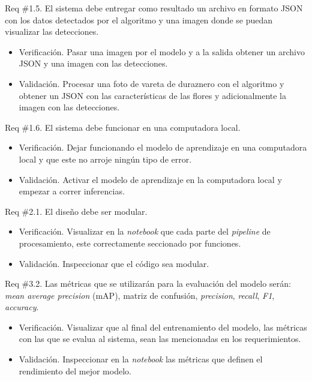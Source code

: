\documentclass[
11pt, %
]{charter}
\begin{document}
Req \#1.5. El sistema debe entregar como resultado un archivo en formato JSON con los datos detectados por el algoritmo y una imagen donde se puedan visualizar las detecciones.

\begin{itemize}
	\item Verificación. Pasar una imagen por el modelo y a la salida obtener un archivo JSON y una imagen con las detecciones.
	
	\item Validación. Procesar una foto de vareta de duraznero con el algoritmo y obtener un JSON con las características de las flores y adicionalmente la imagen con las detecciones. 
\end{itemize}

Req \#1.6. El sistema debe funcionar en una computadora local.

\begin{itemize}
	\item Verificación. Dejar funcionando el modelo de aprendizaje en una computadora local y que este no arroje ningún tipo de error.
	
	\item Validación. Activar el modelo de aprendizaje en la computadora local y empezar a correr inferencias. 
\end{itemize}

Req \#2.1. El diseño debe ser modular.

\begin{itemize}
	\item Verificación. Visualizar en la \textit{notebook} que cada parte del \textit{pipeline} de procesamiento, este correctamente seccionado por funciones.
	
	\item Validación. Inspeccionar que el código sea modular. 
\end{itemize}

Req \#3.2. Las métricas que se utilizarán para la evaluación del modelo serán: \textit{mean average precision} (mAP), matriz de confusión, \textit{precision}, \textit{recall}, \textit{F1}, \textit{accuracy}.

\begin{itemize}
	\item Verificación. Visualizar que al final del entrenamiento del modelo, las métricas con las que se evalua al sistema, sean las mencionadas en los requerimientos.
	
	\item Validación. Inspeccionar en la \textit{notebook} las métricas que definen el rendimiento del mejor modelo. 
\end{itemize}
\end{document}

